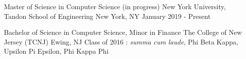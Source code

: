 

\begin{cventries}

  \bentry
    {Master of Science in Computer Science (in progress)} %
    {New York University, Tandon School of Engineering} %
    {New York, NY} %
    {January 2019 - Present} %

  \cventry
    {Bachelor of Science in Computer Science, Minor in Finance} %
    {The College of New Jersey (TCNJ)} %
    {Ewing, NJ} %
    {Class of 2016} %
    {: \emph{summa cum laude}, Phi Beta Kappa, Upsilon Pi Epsilon, Phi Kappa Phi}

\end{cventries}
